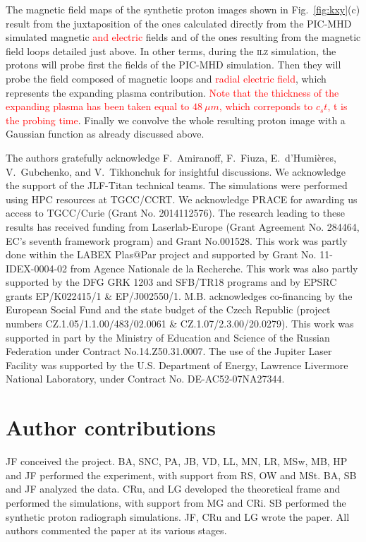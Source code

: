 \documentclass[aps,twocolumn,showpacs,superscriptaddress]{revtex4}
\begin{document}
The magnetic field maps of the synthetic proton images shown in Fig.~\ref{fig:kxy}(c) result from the juxtaposition of the ones calculated directly from the PIC-MHD simulated magnetic \textcolor{red}{and electric} fields and of the ones resulting from the magnetic field loops detailed just above. In other terms, during the \textsc{ilz} simulation, the protons will probe first the fields of the PIC-MHD simulation. Then they will probe the field composed of magnetic loops and \textcolor{red}{radial electric field}, which represents the expanding plasma contribution. \textcolor{red}{Note that the thickness of the expanding plasma has been taken equal to $ 48 \ \mu m $, which correponds to $c_s t $, t is the probing time}. Finally we convolve the whole resulting proton image with a Gaussian function as already discussed above. 

\begin{acknowledgments}
The authors gratefully acknowledge F.~Amiranoff, F.~Fiuza, E.~d'Humi\`eres, V.~Gubchenko, and V.~Tikhonchuk for insightful discussions.
We acknowledge the support of the JLF-Titan technical teams.
The simulations were performed using HPC resources at TGCC/CCRT. We acknowledge PRACE for awarding us access to TGCC/Curie (Grant No. 2014112576).
The research leading to these results has received funding from Laserlab-Europe (Grant Agreement No. 284464, EC's seventh framework program) and Grant No.001528. 
This work was partly done within the LABEX Plas$@$Par project and supported by Grant No. 11-IDEX-0004-02 from Agence Nationale de la Recherche. 
This work was also partly supported by the DFG GRK 1203 and SFB/TR18 programs and by EPSRC grants EP/K022415/1 \& EP/J002550/1. M.B. acknowledges co-financing by the European Social Fund and the state budget of the Czech Republic (project numbers CZ.1.05/1.1.00/483/02.0061 \& CZ.1.07/2.3.00/20.0279). 
This work was supported in part by the Ministry of Education and Science of the Russian Federation under Contract No.14.Z50.31.0007.
The use of the Jupiter Laser Facility  was supported by the U.S. Department of Energy, Lawrence Livermore  National Laboratory, under Contract No. DE-AC52-07NA27344.
\end{acknowledgments}

\section*{Author contributions}
JF conceived the project. BA, SNC, PA, JB, VD, LL, MN, LR, MSw, MB, HP and JF performed the experiment, with support from RS, OW and MSt.  BA, SB and JF analyzed the data. CRu, and LG developed the theoretical frame and performed the simulations, with support from MG and CRi. SB performed the synthetic proton radiograph simulations. JF, CRu and LG wrote the paper. All authors commented the paper at its various stages.
\end{document}
